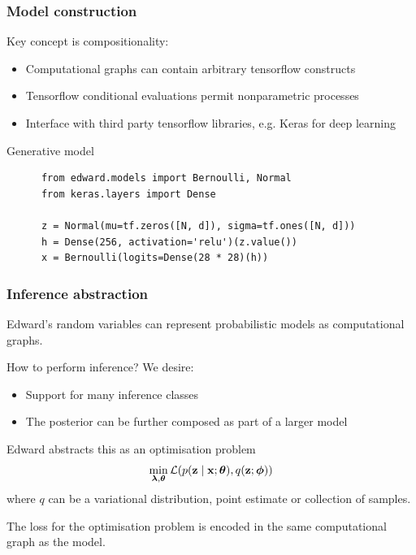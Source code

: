 \documentclass[10pt]{beamer}
\begin{document}
\begin{frame}[fragile]
  \frametitle{Model construction}
  Key concept is compositionality:
  \begin{itemize}
    \item Computational graphs can contain arbitrary tensorflow constructs
    \item Tensorflow conditional evaluations permit nonparametric processes
    \item Interface with third party tensorflow libraries, e.g. Keras for deep learning
  \end{itemize}
  \begin{block}{Generative model}
    \begin{verbatim}
      from edward.models import Bernoulli, Normal
      from keras.layers import Dense

      z = Normal(mu=tf.zeros([N, d]), sigma=tf.ones([N, d]))
      h = Dense(256, activation='relu')(z.value())
      x = Bernoulli(logits=Dense(28 * 28)(h))
    \end{verbatim}
  \end{block}
\end{frame}


\begin{frame}
  \frametitle{Inference abstraction}
  Edward's random variables can represent probabilistic models as computational graphs.

  How to perform inference? We desire:
  \begin{itemize}
    \item Support for many inference classes
    \item The posterior can be further composed as part of a larger model
  \end{itemize}

  Edward abstracts this as an optimisation problem
  \begin{align*}
    \label{eq:inference-optimization}
    \min_{\boldsymbol{\mathbf{\lambda}},\boldsymbol{\mathbf{\theta}}}
    \mathcal{L}(
      p(\mathbf{z} \mid \mathbf{x}; \boldsymbol{\mathbf{\theta}}),
      q(\mathbf{z} ; \boldsymbol{\mathbf{\phi}})
    )
  \end{align*}
  where $q$ can be a variational distribution, point estimate or collection of samples.

  The loss for the optimisation problem is encoded in the same computational graph as the model.
\end{frame}
\end{document}
